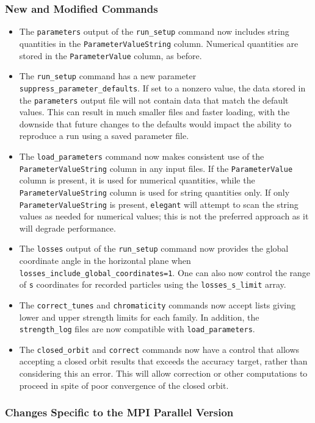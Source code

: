 \documentclass[11pt]{article}
\begin{document}
\subsubsection{New and Modified Commands}
\begin{itemize}
\item The \verb|parameters| output of the \verb|run_setup| command now includes string quantities in the
  \verb|ParameterValueString| column. Numerical quantities are stored in the \verb|ParameterValue| column, as before.
\item The \verb|run_setup| command has a new parameter \verb|suppress_parameter_defaults|. If set to a nonzero value,
  the data stored in the \verb|parameters| output file will not contain data that match the default values.
  This can result in much smaller files and faster loading, with the downside that future changes to the
  defaults would impact the ability to reproduce a run using a saved parameter file.
\item The \verb|load_parameters| command now makes consistent use of the \verb|ParameterValueString| column
  in any input files. If the \verb|ParameterValue| column is present, it is used for numerical quantities, 
  while the \verb|ParameterValueString| column is used for string quantities only.
  If only \verb|ParameterValueString| is present, \verb|elegant| will attempt to scan the string values as
  needed for numerical values; this is not the preferred approach as it will degrade performance.
\item The \verb|losses| output of the \verb|run_setup| command now provides the global coordinate angle in
 the horizontal plane when \verb|losses_include_global_coordinates=1|. One can also now control the 
 range of \verb|s| coordinates for recorded particles using the \verb|losses_s_limit| array.
\item The \verb|correct_tunes| and \verb|chromaticity| commands now accept lists giving lower and upper strength limits
  for each family. In addition, the \verb|strength_log| files are now compatible with \verb|load_parameters|.
\item The \verb|closed_orbit| and \verb|correct| commands now have a control that allows accepting a
  closed orbit results that exceeds the accuracy target, rather than considering this an error.
  This will allow correction or other computations to proceed in spite of poor convergence of the 
  closed orbit.
\end{itemize}


\subsubsection{Changes Specific to the MPI Parallel Version}
\end{document}
